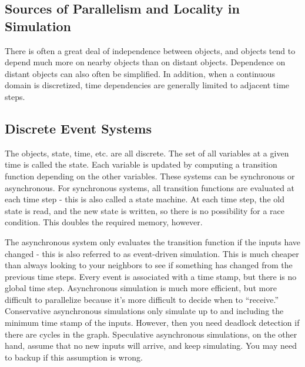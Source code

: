\documentclass[10pt]{article}
\begin{document}
\begin{flushleft}
\section{Sources of Parallelism and Locality in Simulation}

There is often a great deal of independence between objects, and objects tend to depend much more on nearby objects than on distant objects. Dependence on distant objects can also often be simplified. In addition, when a continuous domain is discretized, time dependencies are generally limited to adjacent time steps. 

\subsection{Discrete Event Systems}

The objects, state, time, etc. are all discrete. The set of all variables at a given time is called the state. Each variable is updated by computing a transition function depending on the other variables. These systems can be synchronous or asynchronous. For synchronous systems, all transition functions are evaluated at each time step - this is also called a state machine. At each time step, the old state is read, and the new state is written, so there is no possibility for a race condition. This doubles the required memory, however. 

The asynchronous system only evaluates the transition function if the inputs have changed - this is also referred to as event-driven simulation. This is much cheaper than always looking to your neighbors to see if something has changed from the previous time steps. Every event is associated with a time stamp, but there is no global time step. Asynchronous simulation is much more efficient, but more difficult to parallelize because it's more difficult to decide when to ``receive.'' Conservative asynchronous simulations only simulate up to and including the minimum time stamp of the inputs. However, then you need deadlock detection if there are cycles in the graph. Speculative asynchronous simulations, on the other hand, assume that no new inputs will arrive, and keep simulating. You may need to backup if this assumption is wrong. 


\end{flushleft}
\end{document}

